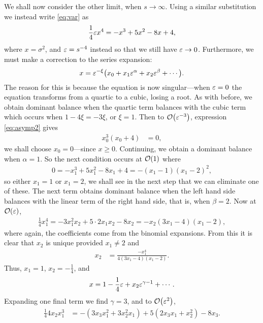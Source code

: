 We shall now consider the other limit, when $s \rightarrow \infty$. Using a similar substitution we instead write \eqref{eq:var} as
\begin{align}
\label{eq:asymp2}
\frac{1}{4} \varepsilon x^4 = -x^3 + 5x^2 - 8x + 4,
\end{align}
where $x = \sigma^2$, and $\varepsilon = s^{-4}$ instead so that we still have $\varepsilon \rightarrow 0$. Furthermore, we must make a correction to the series expansion:
\begin{align}
\label{eq:series2}
x = \eps^{-\xi} \left( x_0 + x_1 \eps^\alpha + x_2 \eps^\beta + \cdots \right).
\end{align}
The reason for this is because the equation is now singular---when $\varepsilon=0$ the equation transforms from a quartic to a cubic, losing a root. As with before, we obtain dominant balance when the quartic term balances with the cubic term which occurs when $1 - 4 \xi = -3 \xi$, or $\xi = 1$. Then to $\bigO{\eps^{-3}}$, expression \eqref{eq:asymp2} gives
\begin{align*}
x_0^3 (x_0 + 4) &= 0,
\end{align*}
we shall choose $x_0 = 0$---since $x \geq 0$. Continuing, we obtain a dominant balance when $\alpha = 1$. So the next condition occurs at $\bigO{1}$ where
\begin{align*}
0 = -x_1^3 + 5x_1^2 - 8x_1 + 4 = -(x_1 - 1)(x_1 - 2)^2,
\end{align*}
so either $x_1 = 1$ or $x_1 = 2$, we shall see in the next step that we can eliminate one of these. The next term obtains dominant balance when the left hand side balances with the linear term of the right hand side, that is, when $\beta = 2$. Now at $\bigO{\eps}$,
\begin{align*}
\frac{1}{4} x_1^4 = -3x_1^2 x_2 + 5\cdot2 x_1 x_2 - 8x_2 = -x_2 (3x_1 - 4)(x_1 - 2),
\end{align*}
where again, the coefficients come from the binomial expansions. From this it is clear that $x_2$ is unique provided $x_1 \ne 2$ and
\begin{align*}
x_2 &= \frac{-x_1^4}{4(3x_1 - 4)(x_1 - 2)}.
\end{align*}
Thus, $x_1 = 1$, $x_2 = -\frac{1}{4}$, and
\begin{align*}
x = 1 - \frac{1}{4} \varepsilon + x_2 \varepsilon^{\gamma - 1} + \cdots.
\end{align*}
Expanding one final term we find $\gamma = 3$, and to $\bigO{\eps^2}$,
\begin{align*}
\frac{1}{4} 4x_2 x_1^3 &= -(3x_3 x_1^2 + 3x_2^2 x_1) + 5(2x_3 x_1 + x_2^2) - 8x_3.
\end{align*}
